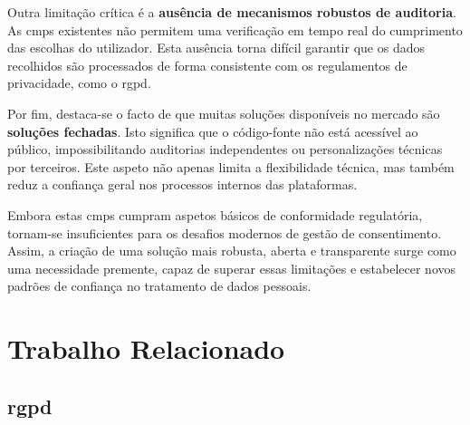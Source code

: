 Outra limitação crítica é a \textbf{ausência de mecanismos robustos de auditoria}. As \acrshort{cmp}s existentes não permitem uma verificação em tempo real do cumprimento das escolhas do utilizador. Esta ausência torna difícil garantir que os dados recolhidos são processados de forma consistente com os regulamentos de privacidade, como o \acrshort{rgpd}.

Por fim, destaca-se o facto de que muitas soluções disponíveis no mercado são \textbf{soluções fechadas}. Isto significa que o código-fonte não está acessível ao público, impossibilitando auditorias independentes ou personalizações técnicas por terceiros. Este aspeto não apenas limita a flexibilidade técnica, mas também reduz a confiança geral nos processos internos das plataformas.

Embora estas \acrshort{cmp}s cumpram aspetos básicos de conformidade regulatória, tornam-se insuficientes para os desafios modernos de gestão de consentimento. Assim, a criação de uma solução mais robusta, aberta e transparente surge como uma necessidade premente, capaz de superar essas limitações e estabelecer novos padrões de confiança no tratamento de dados pessoais.


\section{Trabalho Relacionado}

\subsection{\acrfull{rgpd}}


